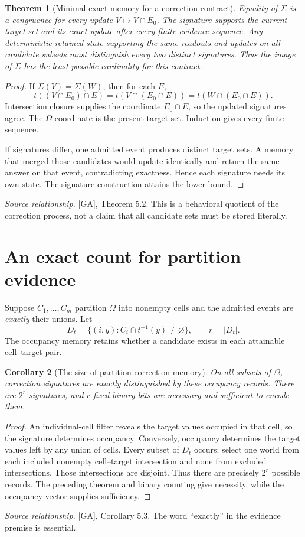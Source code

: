 \documentclass[11pt,oneside,openany]{book}
\newtheorem{theorem}{Theorem}[chapter]
\newtheorem{corollary}[theorem]{Corollary}
\theoremstyle{definition}\newtheorem{definition}[theorem]{Definition}
\newcommand{\source}[1]{\par{\small\textit{Source relationship.} #1}\par}
\begin{document}
\begin{theorem}[Minimal exact memory for a correction contract]\label{r:memory}
Equality of $\Sigma$ is a congruence for every update $V\mapsto V\cap E_0$. The signature supports the current target set and its exact update after every finite evidence sequence. Any deterministic retained state supporting the same readouts and updates on all candidate subsets must distinguish every two distinct signatures. Thus the image of $\Sigma$ has the least possible cardinality for this contract.
\end{theorem}
\begin{proof}
If $\Sigma(V)=\Sigma(W)$, then for each $E$,
\[
t((V\cap E_0)\cap E)=t(V\cap(E_0\cap E))=t(W\cap(E_0\cap E)).
\]
Intersection closure supplies the coordinate $E_0\cap E$, so the updated signatures agree. The $\Omega$ coordinate is the present target set. Induction gives every finite sequence.

If signatures differ, one admitted event produces distinct target sets. A memory that merged those candidates would update identically and return the same answer on that event, contradicting exactness. Hence each signature needs its own state. The signature construction attains the lower bound.
\end{proof}
\source{[GA], Theorem 5.2. This is a behavioral quotient of the correction process, not a claim that all candidate sets must be stored literally.}

\section{An exact count for partition evidence}
Suppose $C_1,\ldots,C_m$ partition $\Omega$ into nonempty cells and the admitted events are \emph{exactly} their unions. Let
\[
D_t=\{(i,y): C_i\cap t^{-1}(y)\ne\varnothing\},\qquad r=|D_t|.
\]
The occupancy memory retains whether a candidate exists in each attainable cell--target pair.

\begin{corollary}[The size of partition correction memory]\label{r:occupancy}
On all subsets of $\Omega$, correction signatures are exactly distinguished by these occupancy records. There are $2^r$ signatures, and $r$ fixed binary bits are necessary and sufficient to encode them.
\end{corollary}
\begin{proof}
An individual-cell filter reveals the target values occupied in that cell, so the signature determines occupancy. Conversely, occupancy determines the target values left by any union of cells. Every subset of $D_t$ occurs: select one world from each included nonempty cell--target intersection and none from excluded intersections. Those intersections are disjoint. Thus there are precisely $2^r$ possible records. The preceding theorem and binary counting give necessity, while the occupancy vector supplies sufficiency.
\end{proof}
\source{[GA], Corollary 5.3. The word ``exactly'' in the evidence premise is essential.}
\end{document}
